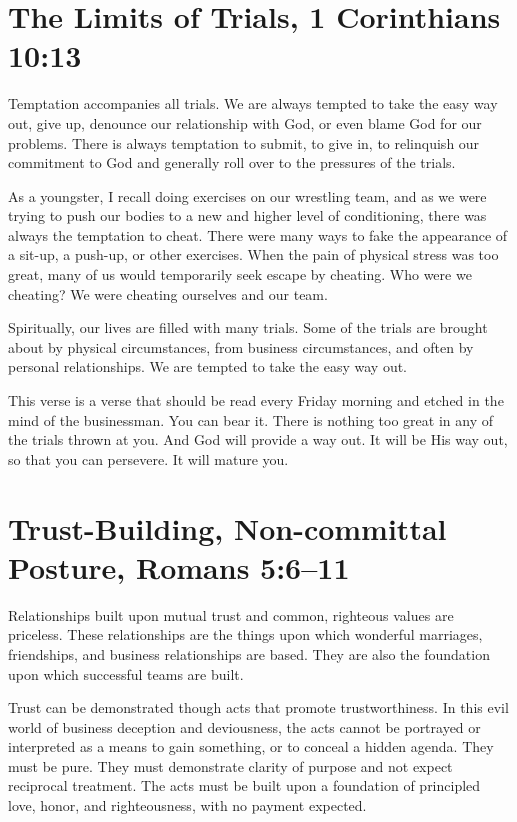 \documentclass[12pt]{memoir}
\begin{document}
\section[The Limits of Trials]{The Limits of Trials, 1 Corinthians 10:13}

Temptation accompanies all trials. We are always tempted to take the easy way out, give up, denounce our relationship with God, or even blame God for our problems. There is always temptation to submit, to give in, to relinquish our commitment to God and generally roll over to the pressures of the trials. 

As a youngster, I recall doing exercises on our wrestling team, and as we were trying to push our bodies to a new and higher level of conditioning, there was always the temptation to cheat. There were many ways to fake the appearance of a sit-up, a push-up, or other exercises. When the pain of physical stress was too great, many of us would temporarily seek escape by cheating. Who were we cheating? We were cheating ourselves and our team. 

Spiritually, our lives are filled with many trials. Some of the trials are brought about by physical circumstances, from business circumstances, and often by personal relationships. We are tempted to take the easy way out. 

This verse is a verse that should be read every Friday morning and
etched in the mind of the businessman. You can bear it. There is nothing
too great in any of the trials thrown at you. And God will provide a way out. It will be His way out, so that you can persevere. It will mature you.

\section[Trust-Building]{Trust-Building, Non-committal Posture, Romans 5:6--11}


Relationships built upon mutual trust and common, righteous values
are priceless. These relationships are the things upon which wonderful
marriages, friendships, and business relationships are based. They
are also the foundation upon which successful teams are built.

Trust can be demonstrated though acts that promote trustworthiness.
In this evil world of business deception and deviousness, the acts
cannot be portrayed or interpreted as a means to gain something, or
to conceal a hidden agenda. They must be pure. They must demonstrate
clarity of purpose and not expect reciprocal treatment. The
acts must be built upon a foundation of principled love, honor, and
righteousness, with no payment expected.
\end{document}
